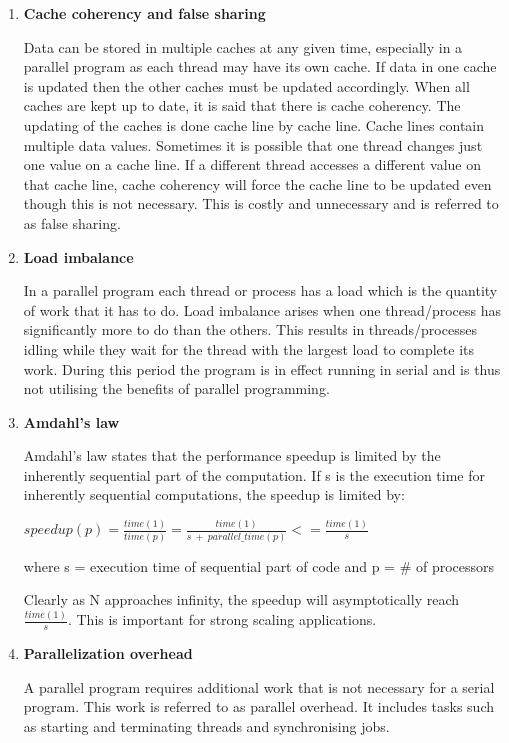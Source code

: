\documentclass[10pt, letterpaper, twoside]{article}
\begin{document}
\begin{titlepage}
\begin{enumerate}
\item \textbf{Cache coherency and false sharing}

Data can be stored in multiple caches at any given time, especially in a parallel program as each thread may have its own cache. If data in one cache is updated then the other caches must be updated accordingly. When all caches are kept up to date, it is said that there is cache coherency. The updating of the caches is done cache line by cache line. Cache lines contain multiple data values. Sometimes it is possible that one thread changes just one value on a
cache line. If a different thread accesses a different value on that cache line, cache coherency will force the cache line to be updated even though this is not necessary. This is costly and unnecessary and is referred to as false sharing. \\

\item \textbf{Load imbalance} 

In a parallel program each thread or process has a load which is the quantity of work that it has to do. Load imbalance arises when one thread/process has significantly more to do than the others. This results in threads/processes idling while they wait for the thread with the largest load to complete its work. During this period the program is in effect running in serial and is thus not utilising the benefits of parallel programming. \\

\item \textbf{Amdahl’s law} 

Amdahl's law states that the performance speedup is limited by the inherently sequential part of the computation. If s is the execution time for inherently sequential computations, the speedup is limited by:  

\(speedup(p) =  \frac{time(1)}{time(p)} = \frac{time(1)}{ s\: +\: parallel\_time(p)} <= \frac{time(1)}{s} \) 

where s = execution time of sequential part of code and p = \# of processors 

Clearly as N approaches infinity, the speedup will asymptotically reach \( \frac{time(1)}{s} \). This is important for strong scaling applications. \\

\item \textbf{Parallelization overhead} 

A parallel program requires additional work that is not necessary for a serial program. This work is referred to as parallel overhead. It includes tasks such as starting and terminating threads and synchronising jobs. \\


\end{enumerate}
\end{titlepage}
\end{document}
